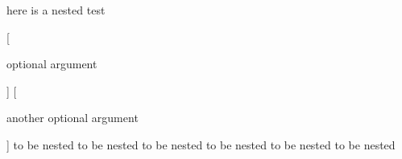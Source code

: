 here is a nested test
\begin{one}

	[

		optional argument

	]
	[

		another optional argument

	]
	to be nested to be nested
	to be nested to be nested
	to be nested to be nested
\end{one}
